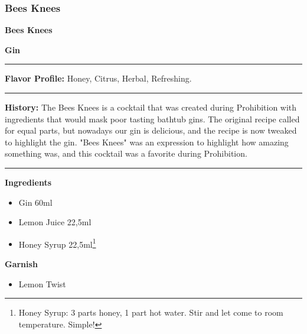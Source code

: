 \subsubsection{Bees Knees}
\noindent
\begin{minipage}{.49\textwidth}
    \noindent\textbf{\LARGE Bees Knees}
\end{minipage}
\hspace{.02\textwidth}
\begin{minipage}{.49\textwidth}
    \raggedleft
    \textbf{\large Gin}\\
\end{minipage}
\vspace{.5em}\hrule\vspace{.5em}
\noindent
\textbf{\large Flavor Profile:} Honey, Citrus, Herbal, Refreshing.
\vspace{.5em}\hrule\vspace{.5em}
\noindent
\textbf{\large History:} The Bees Knees is a cocktail that was created during Prohibition with ingredients that would mask poor tasting bathtub gins. The original recipe called for equal parts, but nowadays our gin is delicious, and the recipe is now tweaked to highlight the gin. "Bees Knees" was an expression to highlight how amazing something was, and this cocktail was a favorite during Prohibition.
\vspace{.5em}\hrule\vspace{.5em}
\noindent
\begin{minipage}[t]{.49\textwidth}
    \noindent
    \textbf{\large Ingredients}
    \begin{itemize}
        \item Gin 60ml
        \item Lemon Juice 22,5ml
        \item Honey Syrup 22,5ml\footnote{Honey Syrup: 3 parts honey, 1 part hot water. Stir and let come to room temperature. Simple!}
    \end{itemize}
    \noindent
    \textbf{\large Garnish}
    \begin{itemize}
        \item Lemon Twist
    \end{itemize}
\end{minipage}
